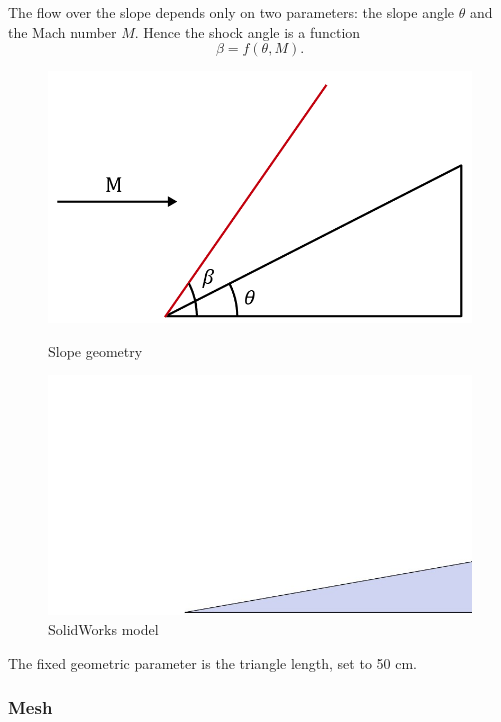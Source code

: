 The flow over the slope depends only on two parameters: the slope angle \(\theta\) and the Mach number \(M\). Hence the shock angle is a function
\[
    \beta = f(\theta, M).
\]
\begin{figure}[H]
    \centering
    \begin{minipage}[b]{0.45\linewidth}
        \centering
        \includegraphics[width=\linewidth]{ressources/images/Slope.png}
        \caption{Slope geometry}
    \end{minipage}
    \hfill
    \begin{minipage}[b]{0.45\linewidth}
        \centering
        \includegraphics[width=\linewidth]{ressources/images/SlopeSW.jpg}
        \caption{SolidWorks model}
    \end{minipage}
    \label{fig:slope}
\end{figure}
The fixed geometric parameter is the triangle length, set to 50 cm.

\subsubsection{Mesh}

